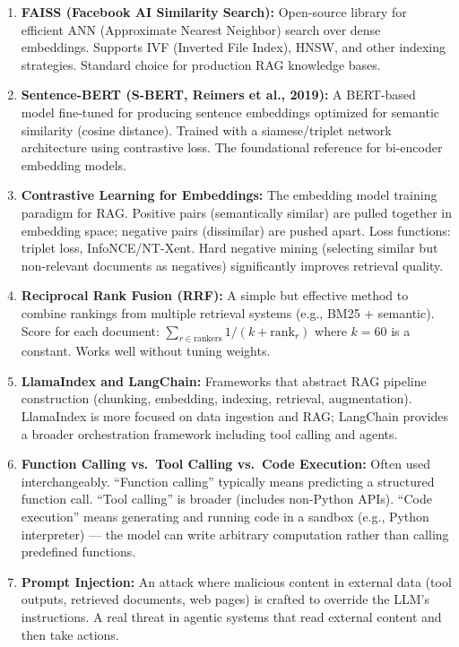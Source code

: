 \documentclass[11pt, a4paper]{article}
\begin{document}
\begin{enumerate}[leftmargin=2em]
  \item \textbf{FAISS (Facebook AI Similarity Search):} Open-source library for efficient ANN (Approximate Nearest Neighbor) search over dense embeddings. Supports IVF (Inverted File Index), HNSW, and other indexing strategies. Standard choice for production RAG knowledge bases.

  \item \textbf{Sentence-BERT (S-BERT, Reimers et al., 2019):} A BERT-based model fine-tuned for producing sentence embeddings optimized for semantic similarity (cosine distance). Trained with a siamese/triplet network architecture using contrastive loss. The foundational reference for bi-encoder embedding models.

  \item \textbf{Contrastive Learning for Embeddings:} The embedding model training paradigm for RAG. Positive pairs (semantically similar) are pulled together in embedding space; negative pairs (dissimilar) are pushed apart. Loss functions: triplet loss, InfoNCE/NT-Xent. Hard negative mining (selecting similar but non-relevant documents as negatives) significantly improves retrieval quality.

  \item \textbf{Reciprocal Rank Fusion (RRF):} A simple but effective method to combine rankings from multiple retrieval systems (e.g., BM25 + semantic). Score for each document: $\sum_{r \in \text{rankers}} 1/(k + \text{rank}_r)$ where $k = 60$ is a constant. Works well without tuning weights.

  \item \textbf{LlamaIndex and LangChain:} Frameworks that abstract RAG pipeline construction (chunking, embedding, indexing, retrieval, augmentation). LlamaIndex is more focused on data ingestion and RAG; LangChain provides a broader orchestration framework including tool calling and agents.

  \item \textbf{Function Calling vs.\ Tool Calling vs.\ Code Execution:} Often used interchangeably. ``Function calling'' typically means predicting a structured function call. ``Tool calling'' is broader (includes non-Python APIs). ``Code execution'' means generating and running code in a sandbox (e.g., Python interpreter) --- the model can write arbitrary computation rather than calling predefined functions.

  \item \textbf{Prompt Injection:} An attack where malicious content in external data (tool outputs, retrieved documents, web pages) is crafted to override the LLM's instructions. A real threat in agentic systems that read external content and then take actions.


\end{enumerate}
\end{document}
